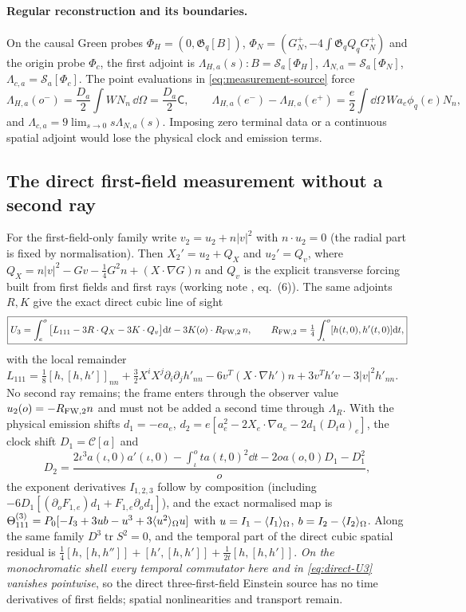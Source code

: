\paragraph{Regular reconstruction and its boundaries.} On the causal Green probes
$\Phi_H=(0,\mathfrak G_q[B])$, $\Phi_N=(G_N^+,-4\int\mathfrak G_qQ_qG_N^+)$ and the origin probe
$\Phi_c$, the first adjoint is $\Lambda_{H,a}(s):B=\mathcal S_a[\Phi_H]$,
$\Lambda_{N,a}=\mathcal S_a[\Phi_N]$, $\Lambda_{c,a}=\mathcal S_a[\Phi_c]$. The point evaluations in
\eqref{eq:measurement-source} force
\begin{equation}\label{eq:first-adjoint-boundaries}
 \Lambda_{H,a}(o^-)=\frac{D_a}2\int WN_n\,\dd\Omega=\frac{D_a}{2}\mathsf C,\qquad
 \Lambda_{H,a}(e^-)-\Lambda_{H,a}(e^+)=\frac e2\int\dd\Omega\,Wa_e\phi_q(e)N_n,
\end{equation}
and $\Lambda_{c,a}=9\lim_{s\to0}s\Lambda_{N,a}(s)$. Imposing zero terminal data or a continuous
spatial adjoint would lose the physical clock and emission terms.

\subsection{The direct first-field measurement without a second ray}
For the first-field-only family write $v_2=u_2+n|v|^2$ with $n\cdot u_2=0$ (the radial part is
fixed by normalisation). Then $X_2'=u_2+Q_X$ and $u_2'=Q_v$, where
$Q_X=n|v|^2-Gv-\frac14G^2n+(X\cdot\nabla G)n$ and $Q_v$ is the explicit transverse forcing built
from first fields and first rays (working note , eq.~(6)).
The same adjoints $R,K$ give the exact direct cubic line of sight
\begin{equation}\label{eq:direct-U3}
\boxed{U_3=\int_e^o\big[L_{111}-3R\cdot Q_X-3K\cdot Q_v\big]\mathrm{d} t
 -3K(o)\cdot R_{{\rm FW},2}\,n,\qquad
 R_{{\rm FW},2}=\tfrac14\int_\iota^o[h(t,0),h'(t,0)]\mathrm{d} t,}
\end{equation}
with the local remainder
$L_{111}=\frac18[h,[h,h']]_{nn}+\frac32X^iX^j\partial_i\partial_jh'_{nn}-6v^T(X\cdot\nabla h')n
+3v^Th'v-3|v|^2h'_{nn}$. No second ray remains; the frame enters through the observer value
$u_2(o)=-R_{{\rm FW},2}n$ and must not be added a second time through $\Lambda_R$. With the physical
emission shifts $d_1=-ea_e$, $d_2=e[a_e^2-2X_e\cdot\nabla a_e-2d_1(D_ta)_e]$, the clock shift
$D_1=\mathcal C[a]$ and
\begin{equation}\label{eq:second-clock}
 D_2=\frac{2\iota^3a(\iota,0)a'(\iota,0)-\int_\iota^ota(t,0)^2\dd t-2oa(o,0)D_1-D_1^2}{o},
\end{equation}
the exponent derivatives $I_{1,2,3}$ follow by composition (including
$-6D_1[(\partial_oF_{1,e})d_1+F_{1,e}\partial_od_1]$), and the exact normalised map is
$\Theta^{(3)}_{111}=P_0[-I_3+3ub-u^3+3\langle u^2\rangle_{\Omega}u]$ with $u=I_1-\langle I_1\rangle_{\Omega}$, $b=I_2-\langle I_2\rangle_{\Omega}$.
Along the same family $D^3\operatorname{tr}S^2=0$, and the temporal part of the direct cubic
spatial residual is $\frac14[h,[h,h'']]+[h',[h,h']]+\frac1{2t}[h,[h,h']]$. \emph{On the
monochromatic shell every temporal commutator here and in \eqref{eq:direct-U3} vanishes
pointwise}, so the direct three-first-field Einstein source has no time derivatives of first
fields; spatial nonlinearities and transport remain.

